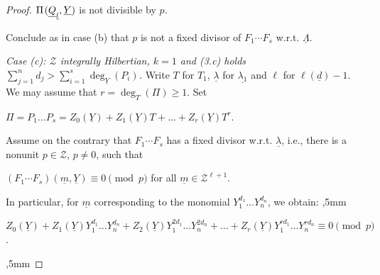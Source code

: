 \documentclass[11pt,a4paper,reqno]{amsart}
\theoremstyle{definition}
\begin{document}
\begin{proof}
\centerline{$\Pi\hskip 1pt (\underline Q_{\underline l},\underline Y)$ is not divisible by $p$.}
\vskip 1mm

\noindent
Conclude as in case (b) that $p$ is not a fixed divisor of $F_1\cdots F_s$ \hbox{w.r.t.} $\underline{\Lambda}$.
\vskip 2mm

\noindent
\emph{Case {\rm (c)}: ${\mathcal Z}$ integrally Hilbertian, $k=1$ and \hbox{\rm (3.c)} holds
$\sum_{j=1}^n d_j > \sum_{i=1}^s \deg_{\underline Y}(P_i)$.}
Write $T$ for $T_1$, $\underline \lambda$ for $\underline{\lambda_1}$ and $\ell$ for $\ell(\underline d)-1$. We may assume that $r=\deg_T(\Pi) \geq 1$. Set
\vskip 1mm

\centerline{$\Pi= P_1 \dots P_s=Z_0(\underline{Y})+Z_1(\underline{Y})T+\dots+Z_r(\underline{Y})T^r$.}
\vskip 1mm

\noindent
Assume on the contrary that $F_1\cdots F_s$ has a fixed divisor \hbox{w.r.t.} $\underline{\lambda}$, \hbox{i.e.}, there is a nonunit $p\in \mathcal{Z}$, $p\not=0$, such that 
\vskip 1mm

\centerline{$(F_1\cdots F_s)(\underline{m},\underline{Y})\equiv 0 \pmod{p}$\hskip 2mm for all $\underline{m} \in \mathcal{Z}^{\ell+1}$.}
\vskip 1mm


\noindent
In particular, for $\underline m$ corresponding to the monomial $Y_1^{d_1}\dots Y_n^{d_n}$, we obtain:
,5mm

\centerline{$Z_0(\underline{Y})+Z_1(\underline{Y})Y_1^{d_1}\dots Y_n^{d_n}+Z_2(\underline{Y})Y_1^{2d_1}\dots Y_n^{2d_n}+\dots+Z_r(\underline{Y})Y_1^{r d_1}\dots Y_n^{r d_n}\equiv 0 \pmod{p}$.}
,5mm






\end{proof}
\end{document}
